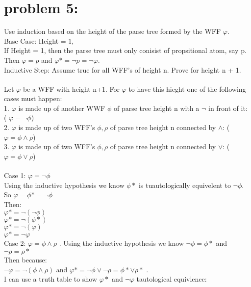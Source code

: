 \documentclass[11pt,leqno,fleqn]{article}
\begin{document}
\newpage
\section{problem 5:}

Use induction based on the height of the parse tree formed by the WFF $\varphi$.\\

Base Case: Height = 1,\\
If Height = 1, then the parse tree must only conisist of propsitional atom, say p. Then $\varphi  = p$ and $\varphi * = \neg{p} = \neg{\varphi}$.\\

Inductive Step: Assume true for all WFF's of height  n. Prove for height n + 1.\\ \\
Let $\varphi$ be a WFF with height n+1. For $\varphi$ to have this hieght one of the following cases must happen:\\
1. $\varphi$ is made up of another WWF $\phi$ of parse tree height  n with a $\neg{}$ in front of it: ( $\varphi = \neg{\phi}$)\\
2. $\varphi$ is made up of two WFF's $\phi,\rho$ of parse tree height n connected by $\land$: ($\varphi = \phi \land \rho$) \\
3. $\varphi$ is made up of two WFF's $\phi,\rho$ of parse tree height n connected by $\lor$: ($\varphi = \phi \lor \rho$) \\
\\
Case 1: $\varphi = \neg{\phi}$ \\
  Using the inductive hypothesis we know $\phi * $ is tuautologically equivelent to $\neg{\phi}$. So $\varphi = \phi * = \neg{\phi}$ \\
 Then: \\
 $\varphi * =  \neg{(\neg{\phi})}$\\
$\varphi * =  \neg{(\phi *)}$\\
$\varphi * =  \neg{(\varphi )}$\\
$\varphi * =  \neg{\varphi }$\\
 
Case 2:  $\varphi = \phi \land \rho $ . Using the inductive hypothesis we know $\neg{\phi} = \phi *$ and $\neg{\rho} = \rho *$\\
Then because:\\
$ \neg{\varphi}  = \neg{(\phi \land \rho)}$ and $\varphi * =  \neg{\phi} \lor \neg{\rho}  =  \phi * \lor \rho* $ . \\
I can use a truth table to show $\varphi *$ and $ \neg{\varphi}$ tautological equivlence: 
\end{document}
